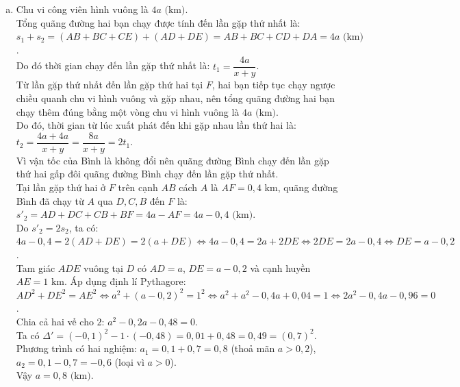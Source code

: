 \begin{bt}
{\begin{enumerate}[a)]
	\item Chu vi công viên hình vuông là $4a\text{ (km)}$.\\
	Tổng quãng đường hai bạn chạy được tính đến lần gặp thứ nhất là:
	$s_1 + s_2 = (AB + BC + CE) + (AD + DE) = AB + BC + CD + DA = 4a\text{ (km)}$.\\
	Do đó thời gian chạy đến lần gặp thứ nhất là:
	$t_1 = \dfrac{4a}{x + y}$.\\
	Từ lần gặp thứ nhất đến lần gặp thứ hai tại $F$, hai bạn tiếp tục chạy ngược chiều quanh chu vi hình vuông và gặp nhau, nên tổng quãng đường hai bạn chạy thêm đúng bằng một vòng chu vi hình vuông là $4a\text{ (km)}$.\\
	Do đó, thời gian từ lúc xuất phát đến khi gặp nhau lần thứ hai là:
	$t_2 = \dfrac{4a + 4a}{x + y} = \dfrac{8a}{x + y} = 2t_1$.\\
	Vì vận tốc của Bình là không đổi nên quãng đường Bình chạy đến lần gặp thứ hai gấp đôi quãng đường Bình chạy đến lần gặp thứ nhất.\\
	Tại lần gặp thứ hai ở $F$ trên cạnh $AB$ cách $A$ là $AF = 0{,}4\text{ km}$, quãng đường Bình đã chạy từ $A$ qua $D, C, B$ đến $F$ là:
	$s'_2 = AD + DC + CB + BF = 4a - AF = 4a - 0{,}4\text{ (km)}$.\\
	Do $s'_2 = 2s_2$, ta có:
	$4a - 0{,}4 = 2(AD + DE) = 2(a + DE) \Leftrightarrow 4a - 0{,}4 = 2a + 2DE \Leftrightarrow 2DE = 2a - 0{,}4 \Leftrightarrow DE = a - 0{,}2$.\\
	Tam giác $ADE$ vuông tại $D$ có $AD = a$, $DE = a - 0{,}2$ và cạnh huyền $AE = 1\text{ km}$. Áp dụng định lí Pythagore:
	$AD^2 + DE^2 = AE^2 \Leftrightarrow a^2 + (a - 0{,}2)^2 = 1^2 \Leftrightarrow a^2 + a^2 - 0{,}4a + 0{,}04 = 1 \Leftrightarrow 2a^2 - 0{,}4a - 0{,}96 = 0$.\\
	Chia cả hai vế cho $2$: $a^2 - 0{,}2a - 0{,}48 = 0$.\\
	Ta có $\Delta' = (-0{,}1)^2 - 1\cdot(-0{,}48) = 0{,}01 + 0{,}48 = 0{,}49 = (0{,}7)^2$.\\
	Phương trình có hai nghiệm:
	$a_1 = 0{,}1 + 0{,}7 = 0{,}8$ (thoả mãn $a > 0{,}2$),\\
	$a_2 = 0{,}1 - 0{,}7 = -0{,}6$ (loại vì $a > 0$).\\
	Vậy $a = 0{,}8\text{ (km)}$.
\end{enumerate}
}
\end{bt}

